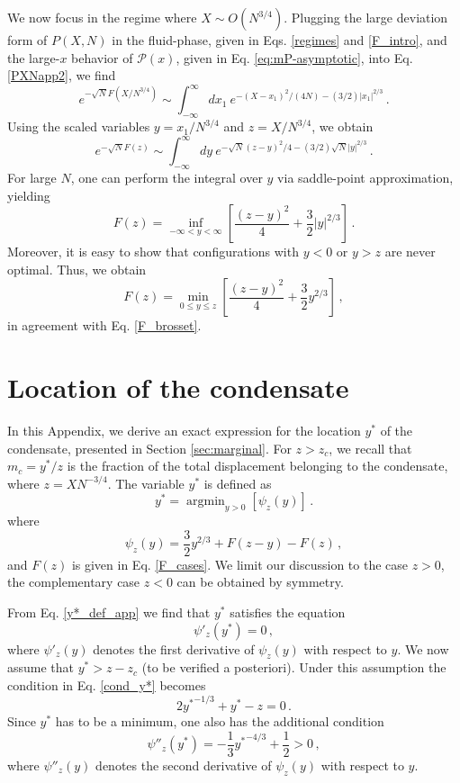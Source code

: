\documentclass[aps,pre,twocolumn,superscriptaddress,showpacs]{revtex4-1}
\newcommand{\be}{\begin{equation}}
\newcommand{\ee}{\end{equation}}
\newcommand{\mP}{\mathcal{P}}
\begin{document}
We now focus in the regime where $X\sim O(N^{3/4})$. Plugging the large deviation form of $P(X,N)$ in the fluid-phase, given in Eqs. \eqref{regimes} and \eqref{F_intro}, and the large-$x$ behavior of $\mP(x)$, given in Eq. \eqref{eq:mP-asymptotic}, into Eq. \eqref{PXNapp2}, we find 
\begin{equation}
e^{-\sqrt{N}F(X/N^{3/4})}\sim \int_{-\infty}^{\infty}dx_1~e^{-(X-x_1)^2/(4N)-(3/2)|x_1|^{2/3}}\,.
\end{equation}
Using the scaled variables $y=x_1/N^{3/4}$ and $z=X/N^{3/4}$, we obtain
\begin{equation}
e^{-\sqrt{N}F(z)}\sim \int_{-\infty}^{\infty}dy~e^{-\sqrt{N}(z-y)^2/4-(3/2)\sqrt{N}|y|^{2/3}}\,.
\end{equation}
For large $N$, one can perform the integral over $y$ via saddle-point approximation, yielding
\be 
F(z)=\inf_{-\infty<y<\infty}\left[\frac{(z-y)^2}{4}+\frac{3}{2}|y|^{2/3}\right]\,.
\ee
Moreover, it is easy to show that configurations with $y<0$ or $y>z$ are never optimal. Thus, we obtain
\be 
F(z)=\min_{0\leq y\leq z}\left[\frac{(z-y)^2}{4}+\frac{3}{2}y^{2/3}\right]\,,
\label{relation_app}
\ee
in agreement with Eq. \eqref{F_brosset}. 



\section{Location of the condensate}
\label{app:location}




In this Appendix, we derive an exact expression for the location $y^*$ of the condensate, presented in Section \ref{sec:marginal}. For $z>z_c$, we recall that $m_c=y^*/z$ is the fraction of the total displacement belonging to the condensate, where $z=X N^{-3/4}$. The variable $y^*$ is defined as
\begin{equation}
y^*=\operatorname{argmin}_{y>0}\left[\psi_z(y)\right]\,.
\label{y*_def_app}
\end{equation}
where
\begin{equation}
\psi_z(y)=\frac{3}{2}y^{2/3}+F(z-y)-F(z)\,,
\label{A_definition_app}
\end{equation}
and $F(z)$ is given in Eq. \eqref{F_cases}. We limit our discussion to the case $z>0$, the complementary case $z<0$ can be obtained by symmetry.


From Eq. \eqref{y*_def_app} we find that $y^*$ satisfies the equation
\be 
\psi'_z(y^*)=0\,,
\label{cond_y*}
\ee 
where $\psi'_z(y)$ denotes the first derivative of $\psi_z(y)$ with respect to $y$. We now assume that $y^*>z-z_c$ (to be verified a posteriori). Under this assumption the condition in Eq. \eqref{cond_y*} becomes
\begin{equation}
2{y^*}^{-1/3}+y^*-z=0\,.
\end{equation}
Since $y^*$ has to be a minimum, one also has the additional condition
\be 
\psi''_z(y^*)=-\frac13 {y^*}^{-4/3}+\frac12>0\,,
\label{cond2_y*}
\ee 
where $\psi''_z(y)$ denotes the second derivative of $\psi_z(y)$ with respect to $y$.
\end{document}
